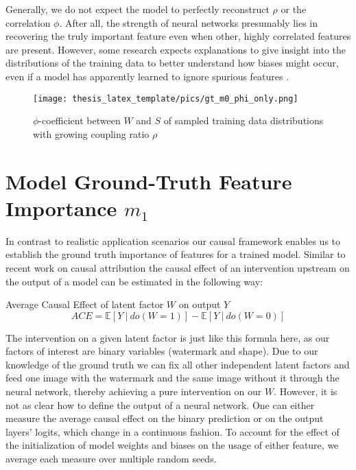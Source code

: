 Generally, we do not expect the model to perfectly reconstruct $\rho$ or the correlation $\phi$. After all, the strength of neural networks presumably lies in recovering the truly important feature even when other, highly correlated features are present. However, some research expects explanations to give insight into the distributions of the training data to better understand how biases might occur, even if a model has apparently learned to ignore spurious features \citep{Kindermans2017}. 

\begin{figure}[t!]
    \centering
    \texttt{[image: thesis\_latex\_template/pics/gt\_m0\_phi\_only.png]}
    \caption[True Data Distribution $m_0$]{$\phi$-coefficient between $W$ and $S$ of sampled training data distributions with growing coupling ratio $\rho$}
    \label{fig:finding_rho}
\end{figure}

\section{Model Ground-Truth Feature Importance $m_1$}\label{section:gt_measure}
In contrast to realistic application scenarios our causal framework enables us to establish the ground truth importance of features for a trained model. Similar to recent work on causal attribution \citep{Goyal2019,Parafita2019,Karimi2023} the causal effect of an intervention upstream on the output of a model can be estimated in the following way:
\begin{center}
Average Causal Effect of latent factor $W$ on output $Y$ \\
\begin{equation}
\displaystyle ACE = \mathbb{E} [ Y \ | \ do(W=1) ] - \mathbb{E} [ Y \ | \ do(W=0) ] 
\end{equation}
\end{center}

The intervention on a given latent factor is just like this formula here, as our factors of interest are binary variables (watermark and shape). Due to our knowledge of the ground truth we can fix all other independent latent factors and feed one image with the watermark and the same image without it through the neural network, thereby achieving a pure intervention on our $W$.  
However, it is not as clear how to define the output of a neural network. One can either measure the average causal effect on the binary prediction or on the output layers' logits, which change in a continuous fashion.
To account for the effect of the initialization of model weights and biases on the usage of either feature, we average each measure over multiple random seeds.


